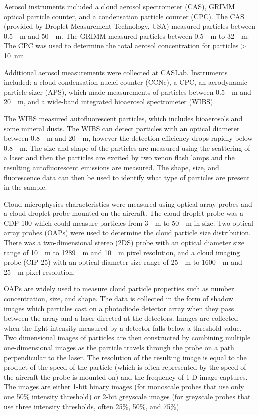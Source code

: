 Aerosol instruments included a cloud aerosol spectrometer (CAS), GRIMM optical particle counter, and a condensation particle counter (CPC). The CAS (provided by Droplet Measurement Technology, USA) measured particles between \SI{0.5}{\mu m} and \SI{50}{\mu m}. The GRIMM measured particles between \SI{0.5}{\mu m} to \SI{32}{\mu m}. The CPC was used to determine the total aerosol concentration for particles > \SI{10}{nm}. \citep{oshea2017}

Additional aerosol measurements were collected at CASLab. Instruments included: a cloud condensation nuclei counter (CCNc), a CPC, an aerodynamic particle sizer (APS), which made measurements of particles between \SI{0.5}{\mu m} and \SI{20}{\mu m}, and a wide-band integrated bioaerosol spectrometer (WIBS). \citep{oshea2017}

The WIBS measured autofluorescent  particles, which includes bioaerosols and some mineral dusts. The WIBS can detect particles with an optical diameter between \SI{0.8}{\mu m} and \SI{20}{\mu m}, however the detection efficiency drops rapidly below \SI{0.8}{\mu m}. The size and shape of the particles are measured using the scattering of a laser and then the particles are excited by two xenon flash lamps and the resulting autofluorescent emissions are measured. The shape, size, and fluorescence data can then be used to identify what type of particles are present in the sample. \citep{oshea2017}

Cloud microphysics characteristics were measured using optical array probes and a cloud droplet probe mounted on the aircraft. The cloud droplet probe was a CDP-100 which could measure particles from \SI{3}{\mu m} to \SI{50}{\mu m} in size. Two optical array probes (OAPs) were used to determine the cloud particle size distribution. There was a two-dimensional stereo (2DS) probe with an optical diameter size range of \SI{10}{\mu m} to \SI{1289}{\mu m} and \SI{10}{\mu m} pixel resolution, and a cloud imaging probe (CIP-25) with an optical diameter size range of \SI{25}{\mu m} to \SI{1600}{\mu m} and \SI{25}{\mu m} pixel resolution.

OAPs are widely used to measure cloud particle properties such as number concentration, size, and shape. The data is collected in the form of shadow images which particles cast on a photodiode detector array when they pass between the array and a laser directed at the detectors. Images are collected when the light intensity measured by a detector falls below a threshold value. Two dimensional images of particles are then constructed by combining multiple one-dimensional images as the particle travels through the probe on a path perpendicular to the laser. The resolution of the resulting image is equal to the product of the speed of the particle (which is often represented by the speed of the aircraft the probe is mounted on) and the frequency of 1-D image captures. The images are either 1-bit binary images (for monoscale probes that use only one 50\% intensity threshold) or 2-bit greyscale images (for greyscale probes that use three intensity thresholds, often 25\%, 50\%, and 75\%). \citep{oshea2021}

